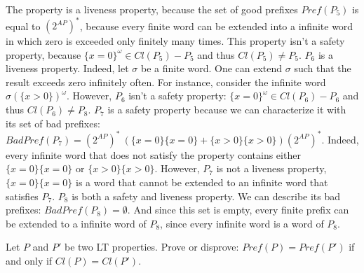 \documentclass[11pt,a4paper]{article}
\newcommand\badp{\mathit{BadPref}}
\newcommand\pref{\mathit{Pref}}
\newcommand\twoap{2^{AP}}
\renewcommand\star{^*}
\newcommand\cl{\mathit{Cl}}
\begin{document}
\begin{Answer}
The property is a liveness property, because the set of good prefixes $\pref(P_5)$ is equal to $(\twoap)\star$, because  every finite word can be extended into a infinite word in which zero is exceeded only finitely many times. This property isn't a safety property, because ${\{x=0\}}^\omega\in\cl(P_5)-P_5$ and thus $\cl(P_5)\neq P_5$.
  \Question%
$P_6$ is a liveness property. Indeed, let $\sigma$ be a finite word. One can extend $\sigma$ such that the result exceeds zero infinitely often. For instance, consider the infinite word ${\sigma(\{x>0\})}^\omega$.
However, $P_6$ isn't a safety property: ${\{x=0\}}^\omega\in\cl(P_6)-P_6$ and thus $\cl(P_6)\neq P_8$.
  \Question%
$P_7$ is a safety property because we can characterize it with its set of bad prefixes: $\badp(P_7)=(\twoap)\star\ (\{x=0\}\{x=0\} + \{x>0\}\{x>0\}) (\twoap)\star$. Indeed, every infinite word that does not satisfy the property contains either $\{x=0\}\{x=0\}$ or $\{x>0\}\{x>0\}$.
However, $P_7$ is not a liveness property, $\{x=0\}\{x=0\}$ is a word that cannot be extended to an infinite word that satisfies $P_7$.
  \Question%
$P_8$ is both a safety and liveness property. We can describe its bad prefixes: $\badp(P_8)=\emptyset$. And since this set is empty, every finite prefix can be extended to a infinite word of $P_8$, since every infinite word is a word of $P_8$.
\end{Answer}

\begin{Exercise}

Let $P$ and $P'$ be two LT properties. Prove or disprove: $Pref(P) = Pref(P')$ if and only if $Cl(P) = Cl(P')$.
\end{Exercise}
\end{document}
